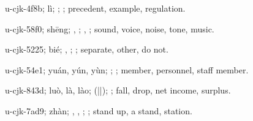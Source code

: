 \begin{multicols}{2}
{\cjkgGlue{}u-cjk-4f8b; lì; \cjkgGlue{}\cjkgGlue{}\cjkgGlue{}; \cjkgGlue{}; precedent, example, regulation.

\cjkgGlue{}u-cjk-58f0; shēng; \cjkgGlue{}, \cjkgGlue{}; \cjkgGlue{}, \cjkgGlue{}; sound, voice, noise, tone, music.

\cjkgGlue{}u-cjk-5225; bié; \cjkgGlue{}\cjkgGlue{}\cjkgGlue{}, \cjkgGlue{}\cjkgGlue{}\cjkgGlue{}; \cjkgGlue{}; separate, other, do not.

\cjkgGlue{}u-cjk-54e1; yuán, yún, yùn; \cjkgGlue{}; \cjkgGlue{}; member, personnel, staff member.

\cjkgGlue{}u-cjk-843d; luò, là, lào; \cjkgGlue{}\cjkgGlue{}(\cjkgGlue{}|\cjkgGlue{}|\cjkgGlue{}); \cjkgGlue{}; fall, drop, net income, surplus.

\cjkgGlue{}u-cjk-7ad9; zhàn; \cjkgGlue{}, \cjkgGlue{}, \cjkgGlue{}; \cjkgGlue{}; stand up, a stand, station.

}
\end{multicols}
